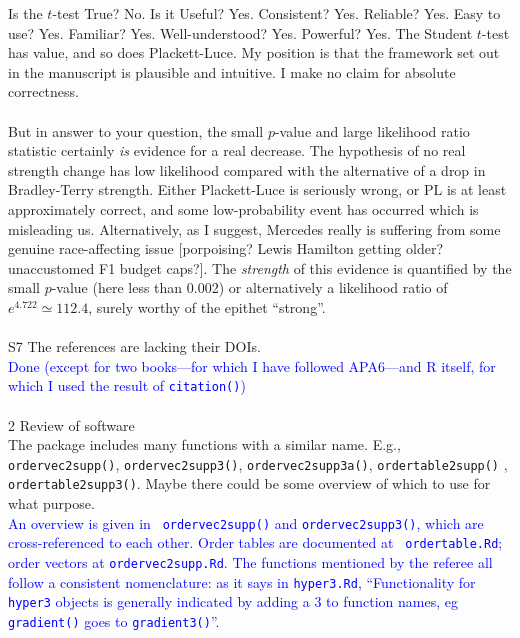\documentclass[12pt]{article}
\begin{document}
{  Is the $t$-test True?  No.  Is it Useful?  Yes.  Consistent?  Yes.
  Reliable?  Yes.  Easy to use?  Yes.  Familiar?  Yes.
  Well-understood?  Yes.  Powerful?  Yes.  The Student $t$-test has
  value, and so does Plackett-Luce.  My position is that the framework
  set out in the manuscript is plausible and intuitive.  I make no
  claim for absolute correctness.\\ \\ But in answer to your question,
  the small $p$-value and large likelihood ratio statistic certainly
  {\em is} evidence for a real decrease.  The hypothesis of no real
  strength change has low likelihood compared with the alternative of
  a drop in Bradley-Terry strength.  Either Plackett-Luce is seriously
  wrong, or PL is at least approximately correct, and some
  low-probability event has occurred which is misleading us.
  Alternatively, as I suggest, Mercedes really is suffering from some
  genuine race-affecting issue [porpoising? Lewis Hamilton getting
    older?  unaccustomed F1 budget caps?].  The {\em strength} of this
  evidence is quantified by the small $p$-value (here less than 0.002)
  or alternatively a likelihood ratio of $e^{4.722}\simeq 112.4$,
  surely worthy of the epithet ``strong''.}\\ \\

S7 The references are lacking their DOIs.\\ \textcolor{blue}{Done
  (except for two books---for which I have followed APA6---and R
  itself, for which I used the result of {\tt citation()})} \\ \\

2 Review of software\\

The package includes many functions with a similar name. E.g., {\tt
  ordervec2supp()}, {\tt ordervec2supp3()}, {\tt ordervec2supp3a()},
{\tt ordertable2supp()} , {\tt ordertable2supp3()}. Maybe there could
be some overview of which to use for what
purpose.\\ \textcolor{blue}{An overview is given in {\tt
    ordervec2supp()} and {\tt ordervec2supp3()}, which are
  cross-referenced to each other.  Order tables are documented at {\tt
    ordertable.Rd}; order vectors at {\tt ordervec2supp.Rd}.  The
  functions mentioned by the referee all follow a consistent
  nomenclature: as it says in {\tt hyper3.Rd}, ``Functionality for
  {\tt hyper3} objects is generally indicated by adding a 3 to
  function names, eg {\tt gradient()} goes to {\tt gradient3()}''.}
\end{document}
